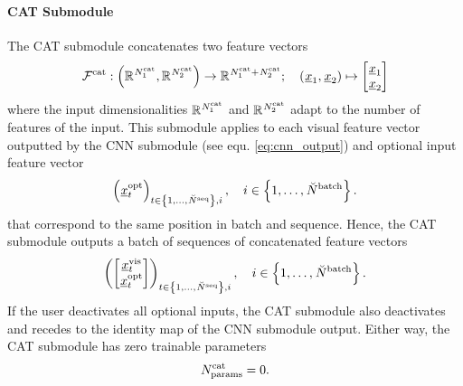\paragraph*{CAT Submodule} ${}$\\
The CAT submodule concatenates
two feature vectors
\begin{align} \label{eq:cat}
    \CATMap
    :
    \tuple{\R{\CATInp{1}}, \R{\CATInp{2}}}
    \rightarrow 
    \R{\CATInp{1} + \CATInp{2}}
    ;\quad
    \tuple{\featvec[]{}{1}{}{}, \featvec[]{}{2}{}{}}
    \mapsto
    \begin{bmatrix}
        \featvec[]{}{1}{}{} \\ \featvec[]{}{2}{}{}
    \end{bmatrix}
\end{align}
where the input dimensionalities
$\mathbb{R}^{\num[]{\cat}{1}{}{}}$
and
$\mathbb{R}^{\num[]{\cat}{2}{}{}}$
adapt to the number of features of the input.
This submodule applies to each
visual feature vector 
outputted by the CNN submodule 
(see equ. \ref{eq:cnn_output})
and optional input feature vector
\begin{equation} \label{eq:batch_opt}
    \series{\optFeatVec{t}}_{t \in \setOfInts{1, \dots, \seqLen}, i}
    ,\quad 
    i \in \setOfInts{1, \dots, \batchSize}.
\end{equation}
that correspond to the same position in batch and sequence.
Hence, the CAT submodule outputs a batch of sequences
of concatenated feature vectors
\begin{equation} \label{eq:cat_output}
    \series{
        \begin{bmatrix} 
            \visFeatVec{t} \\ \optFeatVec{t}
        \end{bmatrix}
    }_{t \in \setOfInts{1, \dots, \seqLen}, i}
    ,\quad 
    i \in \setOfInts{1, \dots, \batchSize}.
\end{equation}
If the user deactivates all optional inputs,
the CAT submodule also deactivates and recedes to 
the identity map of the CNN submodule output.
Either way, the CAT submodule has zero trainable parameters
\begin{equation}
    \CATNumP = 0.
\end{equation}




\newcommand{\GRULayerMap}[1]{\Func[]{\gru}{#1}{}{}}
\newcommand{\GRUNumLayer}{\num[\user]{\gru}{\layer}{}{}}
\newcommand{\GRUInp}[1]{\num[]{\gru}{\inp,#1}{}{}}
\newcommand{\GRUHiddenSize}{\num[\user]{\gru}{\hidden}{}{}}


